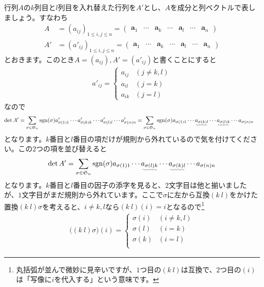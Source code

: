 行列$A$の$k$列目と$l$列目を入れ替えた行列を$A'$とし、$A$を成分と列ベクトルで表しましょう。すなわち
\begin{align*}
A &= (a_{ij})_{1 \leq i, j \leq n} =
\begin{pmatrix}
\bm{a}_1 & \cdots & \bm{a}_k & \cdots & \bm{a}_l & \cdots & \bm{a}_n
\end{pmatrix} \\
A' &= (a'_{ij})_{1 \leq i, j \leq n} =
\begin{pmatrix}
\bm{a}_1 & \cdots & \bm{a}_k & \cdots & \bm{a}_l & \cdots & \bm{a}_n
\end{pmatrix}
\end{align*}
とおきます。このとき$A = (a_{ij}), A' = (a'_{ij})$と書くことにすると
\begin{align*}
a'_{ij} =
\begin{cases}
a_{ij} & (j \neq k, l)\\
a_{il} & (j = k) \\
a_{ik} & (j = l)
\end{cases}
\end{align*}
なので
\begin{align*}
\det A'
&= \sum_{\sigma \in \mathfrak{S}_n} \sgn(\sigma) a'_{\sigma(1)1} \cdots a'_{\sigma(k)k} \cdots a'_{\sigma(l)l} \cdots a'_{\sigma(n)n}
= \sum_{\sigma \in \mathfrak{S}_n} \sgn(\sigma) a_{\sigma(1)1} \cdots \uwave{a_{\sigma(k)l}} \cdots \uwave{a_{\sigma(l)k}} \cdots a_{\sigma(n)n}
\end{align*}
となります。$k$番目と$l$番目の項だけが規則から外れているので気を付けてください。この$2$つの項を並び替えると
\[
\det A'
= \sum_{\sigma \in \mathfrak{S}_n} \sgn(\sigma) a_{\sigma(1)1} \cdots \uwave{a_{\sigma(l)k}} \cdots \uwave{a_{\sigma(k)l}} \cdots a_{\sigma(n)n} \\
\]
となります。$k$番目と$l$番目の因子の添字を見ると、$2$文字目は他と揃いましたが、$1$文字目がまだ規則から外れています。ここで$\sigma$に左から互換$(k\ l)$をかけた置換$(k\ l) \sigma$を考えると、$i \neq k, l$なら$(k\ l)(i) = i$となるので\footnote{丸括弧が並んで微妙に見辛いですが、$1$つ目の$(k\ l)$は互換で、$2$つ目の$(i)$は「写像に$i$を代入する」という意味です。}
\begin{align*}
\bigl( (k\  l)\sigma\bigr)(i)
=
\begin{cases}
\sigma(i) & (i \neq k, l) \\
\sigma(l) & (i = k) \\
\sigma(k) & (i = l) \\
\end{cases}
\end{align*}
